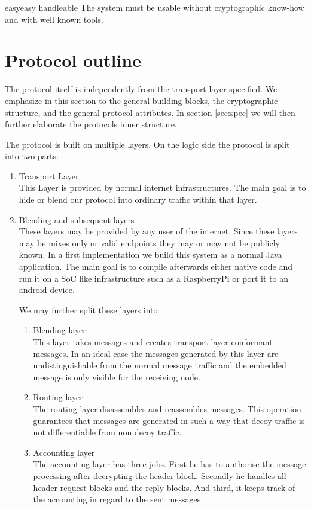 \begin{requirement}{easy}{easy handleable}
	The system must be usable without cryptographic know-how and with well known tools.
\end{requirement}

\section{Protocol outline}
The protocol itself is independently from the transport layer specified. We emphasize in this section to the general building blocks, the cryptographic structure, and the general protocol attributes. In section \ref{sec:spec} we will then further elaborate the protocols inner structure.

The protocol is built on multiple layers. On the logic side the protocol is split into two parts:
\begin{enumerate}
	\item Transport Layer\\
	      This Layer is provided by normal internet infrastructures. The main goal is to hide or blend our protocol into ordinary traffic within that layer.
	\item Blending and subsequent layers\\
	      These layers may be provided by any user of the internet. Since these layers may be mixes only or valid endpoints they may or may not be publicly known. In a first implementation we build this system as a normal Java application. The main goal is to compile afterwards either native code and run it on a SoC like infrastructure such as a RaspberryPi or port it to an android device.
	      
	      We may further split these layers into
	      \begin{enumerate}
	      	\item Blending layer\\
	      	      This layer takes messages and creates transport layer conformant messages. In an ideal case the messages generated by this layer are undistinguishable from the normal message traffic and the embedded message is only visible for the receiving node.
	      	\item Routing layer\\
	      	      The routing layer disassembles and reassembles messages. This operation guarantees that messages are generated in such a way that decoy traffic is not differentiable from non decoy traffic.
	      	\item Accounting layer\\
	      	      The accounting layer has three jobs. First he has to authorise the message processing after decrypting the header block. Secondly he handles all header request blocks and the reply blocks. And third, it keeps track of the accounting in regard to the sent messages.    
	      \end{enumerate}
\end{enumerate}

